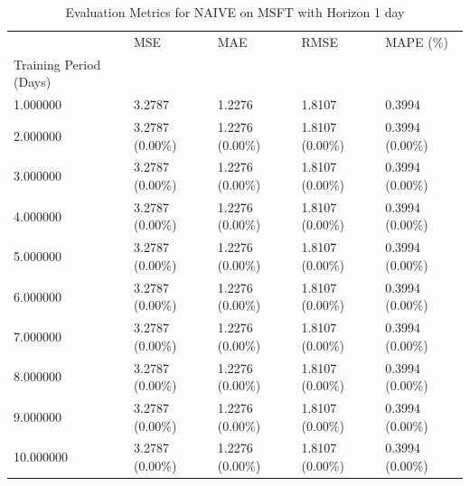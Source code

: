 \begin{table}
\caption{Evaluation Metrics for NAIVE on MSFT with Horizon 1 day}
\label{tab:naive_MSFT_h1_metrics}
\begin{tabular}{lllll}
\toprule
 & MSE & MAE & RMSE & MAPE (\%) \\
Training Period (Days) &  &  &  &  \\
\midrule
1.000000 & 3.2787 & 1.2276 & 1.8107 & 0.3994 \\
2.000000 & 3.2787 (0.00\%) & 1.2276 (0.00\%) & 1.8107 (0.00\%) & 0.3994 (0.00\%) \\
3.000000 & 3.2787 (0.00\%) & 1.2276 (0.00\%) & 1.8107 (0.00\%) & 0.3994 (0.00\%) \\
4.000000 & 3.2787 (0.00\%) & 1.2276 (0.00\%) & 1.8107 (0.00\%) & 0.3994 (0.00\%) \\
5.000000 & 3.2787 (0.00\%) & 1.2276 (0.00\%) & 1.8107 (0.00\%) & 0.3994 (0.00\%) \\
6.000000 & 3.2787 (0.00\%) & 1.2276 (0.00\%) & 1.8107 (0.00\%) & 0.3994 (0.00\%) \\
7.000000 & 3.2787 (0.00\%) & 1.2276 (0.00\%) & 1.8107 (0.00\%) & 0.3994 (0.00\%) \\
8.000000 & 3.2787 (0.00\%) & 1.2276 (0.00\%) & 1.8107 (0.00\%) & 0.3994 (0.00\%) \\
9.000000 & 3.2787 (0.00\%) & 1.2276 (0.00\%) & 1.8107 (0.00\%) & 0.3994 (0.00\%) \\
10.000000 & 3.2787 (0.00\%) & 1.2276 (0.00\%) & 1.8107 (0.00\%) & 0.3994 (0.00\%) \\
\bottomrule
\end{tabular}
\end{table}
